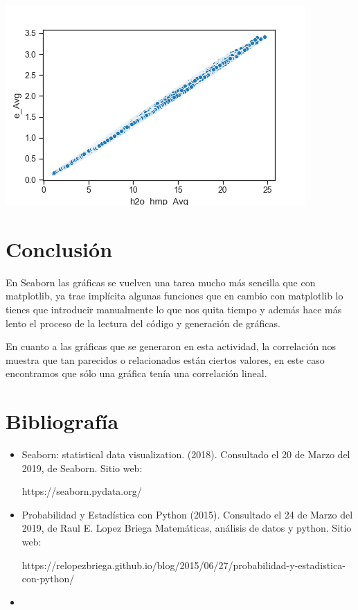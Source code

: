 \documentclass{article}
\begin{document}
\begin{center}
    \includegraphics[scale = 0.5]{corr8.png}
\end{center}

\section{Conclusión}
En Seaborn las gráficas se vuelven una tarea mucho más sencilla que con matplotlib, ya trae implícita algunas funciones que en cambio con matplotlib lo tienes que introducir manualmente lo que nos quita tiempo y además hace más lento el proceso de la lectura del código y generación de gráficas.

En cuanto a las gráficas que se generaron en esta actividad, la correlación nos muestra que tan parecidos o relacionados están ciertos valores, en este caso encontramos que sólo una gráfica tenía una correlación lineal.

\section{Bibliografía}
\begin{itemize}
    \item Seaborn: statistical data visualization. (2018). Consultado el 20 de Marzo del 2019, de Seaborn. Sitio web: 
    
    https://seaborn.pydata.org/
    
    \item Probabilidad y Estadística con Python (2015). Consultado el 24 de Marzo del 2019, de Raul E. Lopez Briega Matemáticas, análisis de datos y python. Sitio web:
    
    https://relopezbriega.github.io/blog/2015/06/27/probabilidad-y-estadistica-con-python/
    
    \item 
    
\end{itemize}
\end{document}
